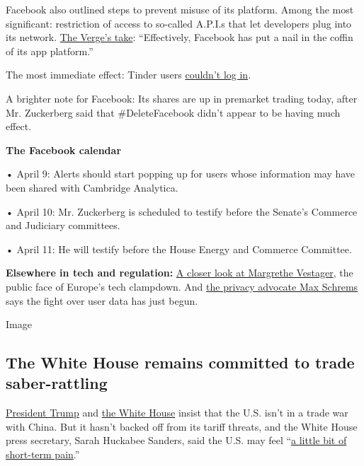 Facebook also outlined steps to prevent misuse of its platform. Among
the most significant: restriction of access to so-called A.P.I.s that
let developers plug into its network.
\href{https://www.theverge.com/2018/4/4/17199632/facebook-cambridge-analytica-data-collection-87-million-users-api-developer-restrictions?dlbk}{The
Verge's take}: ``Effectively, Facebook has put a nail in the coffin of
its app platform.''

The most immediate effect: Tinder users
\href{http://nymag.com/selectall/2018/04/cant-log-into-tinder-blame-facebook.html?dlbk}{couldn't
log in}.

A brighter note for Facebook: Its shares are up in premarket trading
today, after Mr. Zuckerberg said that \#DeleteFacebook didn't appear to
be having much effect.

\textbf{The Facebook calendar}

• April 9: Alerts should start popping up for users whose information
may have been shared with Cambridge Analytica.

• April 10: Mr. Zuckerberg is scheduled to testify before the Senate's
Commerce and Judiciary committees.

• April 11: He will testify before the House Energy and Commerce
Committee.

\textbf{Elsewhere in tech and regulation:}
\href{https://www.wsj.com/articles/the-woman-who-is-reining-in-americas-technology-giants-1522856428?dlbk}{A
closer look at Margrethe Vestager}, the public face of Europe's tech
clampdown. And
\href{https://www.ft.com/content/86d1ce50-3799-11e8-8eee-e06bde01c544?dlbk}{the
privacy advocate Max Schrems} says the fight over user data has just
begun.

Image

\hypertarget{the-white-house-remains-committed-to-trade-saber-rattling}{%
\subsection{The White House remains committed to trade
saber-rattling}\label{the-white-house-remains-committed-to-trade-saber-rattling}}

\href{https://twitter.com/realDonaldTrump/status/981492087328792577}{President
Trump} and
\href{https://www.youtube.com/watch?time_continue=19\&v=uN1SkixgZ5Y}{the
White House} insist that the U.S. isn't in a trade war with China. But
it hasn't backed off from its tariff threats, and the White House press
secretary, Sarah Huckabee Sanders, said the U.S. may feel
``\href{https://www.politico.com/story/2018/04/04/china-tariffs-us-imports-trump-500163?dlbk}{a
little bit of short-term pain}.''

